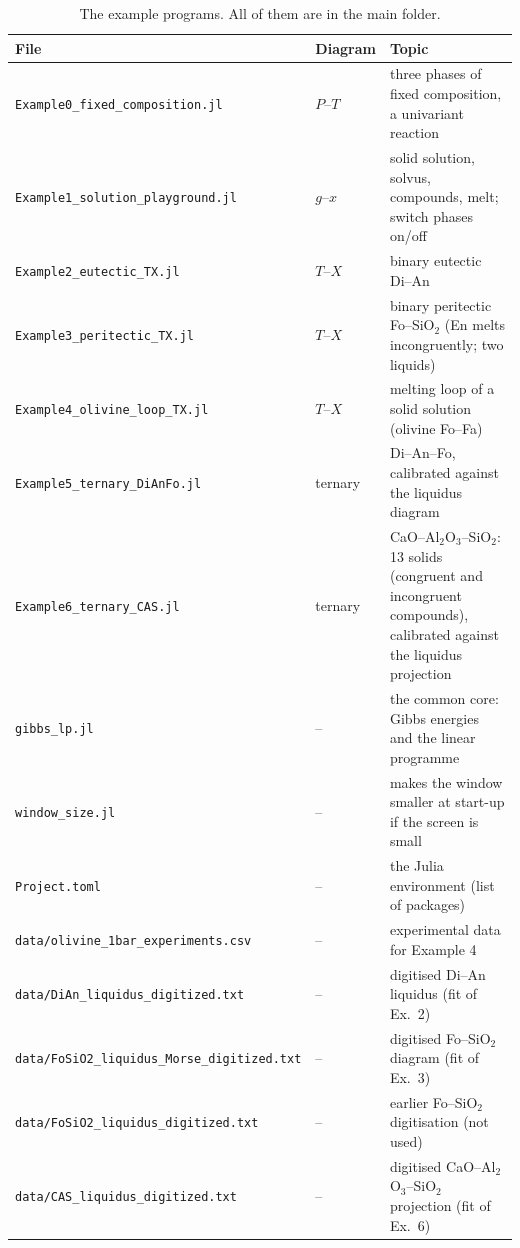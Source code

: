 \documentclass[11pt,a4paper]{article}
\newcommand{\file}[1]{\texttt{#1}}
\begin{document}
\begin{table}[H]
\centering\footnotesize
\caption{The example programs. All of them are in the main folder.}\label{tab:files}
\begin{tabular}{@{}ll>{\raggedright\arraybackslash}p{6.9cm}@{}}
\toprule
File & Diagram & Topic \\
\midrule
\file{Example0\_fixed\_composition.jl}   & $P$–$T$       & three phases of fixed composition, a univariant reaction \\
\file{Example1\_solution\_playground.jl} & $g$–$x$       & solid solution, solvus, compounds, melt; switch phases on/off \\
\file{Example2\_eutectic\_TX.jl}         & $T$–$X$       & binary eutectic Di–An \\
\file{Example3\_peritectic\_TX.jl}       & $T$–$X$       & binary peritectic Fo–SiO$_2$ (En melts incongruently; two liquids) \\
\file{Example4\_olivine\_loop\_TX.jl}    & $T$–$X$       & melting loop of a solid solution (olivine Fo–Fa) \\
\file{Example5\_ternary\_DiAnFo.jl}      & ternary       & Di–An–Fo, calibrated against the liquidus diagram \\
\file{Example6\_ternary\_CAS.jl}         & ternary       & CaO–Al$_2$O$_3$–SiO$_2$: 13 solids (congruent and incongruent compounds), calibrated against the liquidus projection \\
\midrule
\file{gibbs\_lp.jl}                      & --            & the common core: Gibbs energies and the linear programme \\
\file{window\_size.jl}                   & --            & makes the window smaller at start-up if the screen is small \\
\file{Project.toml}                      & --            & the Julia environment (list of packages) \\
\file{data/olivine\_1bar\_experiments.csv} & --          & experimental data for Example 4 \\
\file{data/DiAn\_liquidus\_digitized.txt} & --           & digitised Di–An liquidus (fit of Ex.~2) \\
\file{data/FoSiO2\_liquidus\_Morse\_digitized.txt} & --  & digitised Fo–SiO$_2$ diagram (fit of Ex.~3) \\
\file{data/FoSiO2\_liquidus\_digitized.txt} & --         & earlier Fo–SiO$_2$ digitisation (not used) \\
\file{data/CAS\_liquidus\_digitized.txt} & --            & digitised CaO–Al$_2$O$_3$–SiO$_2$ projection (fit of Ex.~6) \\

\end{tabular}
\end{table}
\end{document}
